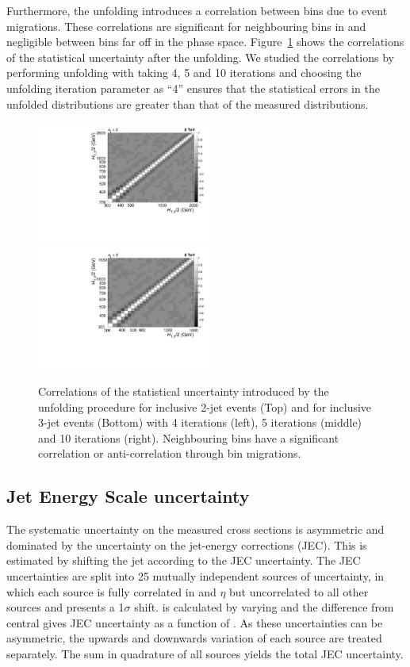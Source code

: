 Furthermore, the unfolding introduces a correlation between bins due to event migrations. These correlations are significant for neighbouring bins in \httwo and negligible between bins far off in the phase space. Figure~\ref{fig:corr} shows the correlations of the statistical uncertainty after the unfolding. We studied the correlations by performing unfolding with taking 4, 5 and 10 iterations and choosing the unfolding iteration parameter as ``4'' ensures that the statistical errors in the unfolded distributions are greater than that of the measured distributions. 

\begin{figure}[h]
 \begin{center}
 \includegraphics[width=0.51\textwidth]{Plots_HT_2_150/Correlation_Matrix_NLO_2_ite4.pdf}%
 ~~\includegraphics[width=0.51\textwidth]{Plots_HT_2_150/Correlation_Matrix_NLO_3_ite4.pdf}%
 \caption{Correlations of the statistical uncertainty introduced by the unfolding procedure for inclusive 2-jet events (Top) and for inclusive 3-jet events (Bottom) with 4 iterations (left), 5 iterations (middle) and 10 iterations (right). Neighbouring bins have a significant correlation or anti-correlation through bin migrations.}
 \label{fig:corr}
 \end{center}
\end{figure}

\subsection{Jet Energy Scale uncertainty}
The systematic uncertainty on the measured cross sections is asymmetric and dominated by the uncertainty on the jet-energy corrections (JEC). This is estimated by shifting the jet \pt according to the JEC uncertainty. The JEC uncertainties are split 
into 25 mutually independent sources of uncertainty, in which each source is fully correlated in \pt and $\eta$ but uncorrelated to all 
other sources and presents a 1$\sigma$ shift. \httwo is calculated by varying \pt and the difference from central \httwo gives JEC uncertainty as a function of \httwo. As these uncertainties can be asymmetric, the upwards and downwards variation of each source 
are treated separately. The sum in quadrature of all sources yields the total JEC uncertainty.

